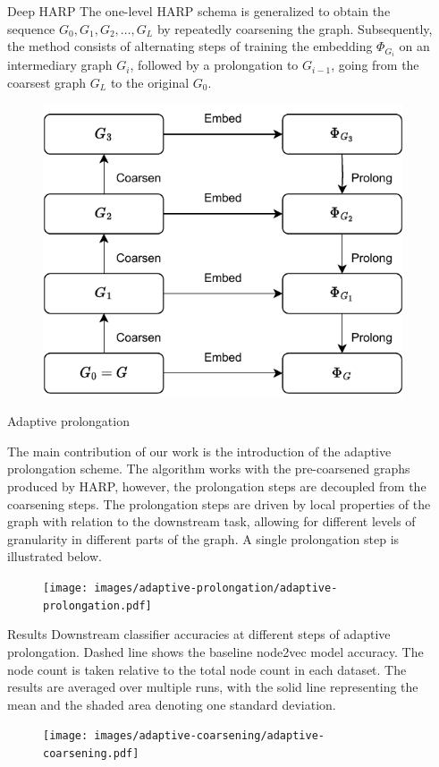 \documentclass{beamer}
\newlength{\sepwidth}
\newlength{\colwidth}
\newcommand{\separatorcolumn}{\begin{column}{\sepwidth}\end{column}}
\begin{document}
\begin{frame}[t]
\begin{columns}[t]
	\separatorcolumn

	\begin{column}{\colwidth}
		\begin{block}{Deep HARP}
			The one-level HARP schema is generalized to obtain the sequence \( G_0, G_1, G_2, \dots, G_L \) by repeatedly coarsening the graph. Subsequently, the method consists of alternating steps of training the embedding \( \Phi_{G_i} \) on an intermediary graph \( G_i \), followed by a prolongation to \( G_{i - 1} \), going from the coarsest graph \( G_L \) to the original \( G_0 \).
			\begin{figure}
				\includegraphics[width=0.5\linewidth]{images/deep-harp/deep-harp.pdf}
			\end{figure}
		\end{block}

		\begin{block}{Adaptive prolongation}

			The main contribution of our work is the introduction of the adaptive prolongation scheme. The algorithm works with the pre-coarsened graphs produced by HARP, however, the prolongation steps are decoupled from the coarsening steps. The prolongation steps are driven by local properties of the graph with relation to the downstream task, allowing for different levels of granularity in different parts of the graph. A single prolongation step is illustrated below.

			\begin{figure}
				\texttt{[image: images/adaptive-prolongation/adaptive-prolongation.pdf]}
			\end{figure}
		\end{block}

		\begin{block}{Results}
			Downstream classifier accuracies at different steps of adaptive prolongation. Dashed line shows the baseline node2vec model accuracy. The node count is taken relative to the total node count in each dataset. The results are averaged over multiple runs, with the solid line representing the mean and the shaded area denoting one standard deviation.
			\begin{figure}
				\texttt{[image: images/adaptive-coarsening/adaptive-coarsening.pdf]}
			\end{figure}
		\end{block}


\end{column}
\end{columns}
\end{frame}
\end{document}
